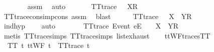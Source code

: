 \begin{isabellebody}
\ \ \ \ \ \ \isamarkupfalse%
\ assm{}\ \isamarkupfalse%
\ auto\isanewline
\ \ \ \ \isamarkupfalse%
\ {}{\isacharcolon}\ {\isachardoublequoteopen}TT{}{\isacharunderscore}trace\ {\isacharparenleft}{\isasymsigma}{\isacharprime}\ {\isacharat}\ {\isacharbrackleft}X{\isacharbrackright}\isactrlsub R\ {\isacharhash}\ {\isasymsigma}{\isacharparenright}{\isachardoublequoteclose}\isanewline
\ \ \ \ \ \ \isamarkupfalse%
\ TT{}{\isacharunderscore}trace{\isacharunderscore}cons{\isacharunderscore}imp{\isacharunderscore}cons\ assm{}\ \isamarkupfalse%
\ blast\isanewline
\ \ \ \ \isamarkupfalse%
\ {\isachardoublequoteopen}TT{}{\isacharunderscore}trace\ {\isacharparenleft}{\isasymsigma}{\isacharprime}\ {\isacharat}\ {\isacharbrackleft}X\ {\isasymunion}\ Y{\isacharbrackright}\isactrlsub R\ {\isacharhash}\ {\isasymsigma}{\isacharparenright}{\isachardoublequoteclose}\isanewline
\ \ \ \ \ \ \isamarkupfalse%
\ ind{\isacharunderscore}hyp\ {}\ {}\ \isamarkupfalse%
\ auto\isanewline
\ \ \ \ \isamarkupfalse%
\ \isamarkupfalse%
\ {\isachardoublequoteopen}TT{}{\isacharunderscore}trace\ {\isacharparenleft}{\isacharbrackleft}Event\ e{\isacharbrackright}\isactrlsub E\ {\isacharhash}\ {\isasymsigma}{\isacharprime}\ {\isacharat}\ {\isacharbrackleft}X\ {\isasymunion}\ Y{\isacharbrackright}\isactrlsub R\ {\isacharhash}\ {\isasymsigma}{\isacharparenright}{\isachardoublequoteclose}\isanewline
\ \ \ \ \ \ \isamarkupfalse%
\ {\isacharparenleft}metis\ TT{}{\isacharunderscore}trace{\isachardot}simps{\isacharparenleft}{}{\isacharparenright}\ TT{}{\isacharunderscore}trace{\isachardot}simps{\isacharparenleft}{}{\isacharparenright}\ list{\isachardot}exhaust{\isacharparenright}\isanewline
\ \ \isamarkupfalse%
\isanewline
{}\isamarkupfalse%
%
\endisatagproof
{\isafoldproof}%
%
\isadelimproof
\isanewline
%
\endisadelimproof
\isanewline
{}\isamarkupfalse%
\ ttWF{\isacharunderscore}traces{\isacharunderscore}TT{}{\isacharcolon}\isanewline
\ \ {\isachardoublequoteopen}TT{}\ {\isacharbraceleft}t{\isachardot}\ ttWF\ t\ {\isasymand}\ TT{}{\isacharunderscore}trace\ t{\isacharbraceright}{\isachardoublequoteclose}\isanewline
%
\isadelimproof
\ \ %
\endisadelimproof
%
\isatagproof
{}\isamarkupfalse%

\end{isabellebody}
